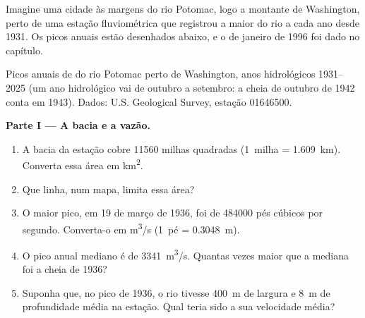 \begin{problem}
\label{pb:g10:drainage-basins:1}
Imagine uma cidade às margens do rio Potomac, logo a montante de Washington,
perto de uma estação fluviométrica que registrou a maior  do rio a cada
ano desde 1931. Os picos anuais estão desenhados abaixo, e o  de
janeiro de 1996 foi dado no capítulo.

\begin{center}

{\small Picos anuais de  do rio Potomac perto de Washington, anos
hidrológicos 1931--2025 (um ano hidrológico vai de outubro a setembro: a
cheia de outubro de 1942 conta em 1943). Dados: U.S. Geological Survey,
estação 01646500.}
\end{center}

\medskip
\noindent\textbf{Parte I --- A bacia e a vazão.}
\begin{enumerate}
  \item A bacia da estação cobre \num{11560} milhas quadradas
        (\num{1}~milha = \qty{1.609}{km}). Converta essa área em
        \unit{km^2}.
  \item Que linha, num mapa, limita essa área?
  \item O maior pico, em 19 de março de 1936, foi de \num{484000} pés
        cúbicos por segundo. Converta-o em \unit{m^3/s} (\num{1}~pé =
        \qty{0.3048}{m}).
  \item O pico anual mediano é de \qty{3341}{m^3/s}. Quantas vezes maior que
        a mediana foi a cheia de 1936?
  \item Suponha que, no pico de 1936, o rio tivesse \qty{400}{m} de largura
        e \qty{8}{m} de profundidade média na estação. Qual teria sido a sua
        velocidade média?
\end{enumerate}


\end{problem}
